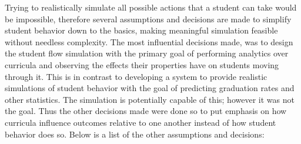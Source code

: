 \documentclass[botnum, fleqn]{unmeethesis}
\begin{document}
  Trying to realistically simulate all possible actions that a student can take would be impossible, therefore several assumptions and decisions are made to simplify student behavior down to the basics, making meaningful simulation feasible without needless complexity. The most influential decisions made, was to design the student flow simulation with the primary goal of performing analytics over curricula and observing the effects their properties have on students moving through it. This is in contrast to developing a system to provide realistic simulations of student behavior with the goal of predicting graduation rates and other statistics. The simulation is potentially capable of this; however it was not the goal. Thus the other decisions made were done so to put emphasis on how curricula influence outcomes relative to one another instead of how student behavior does so. Below is a list of the other assumptions and decisions:
\end{document}
